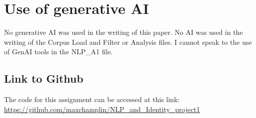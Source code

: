 \documentclass[11pt]{article}
\begin{document}
\section{Use of generative AI}
No generative AI was used in the writing of this paper. No AI was used in the writing of the Corpus Load and Filter or Analysis files. I cannot speak to the use of GenAI tools in the NLP\_A1 file.  

\subsection{Link to Github}

The code for this assignment can be accessed at this link: \url{https://github.com/maxchamplin/NLP_and_Identity_project1}
\end{document}
